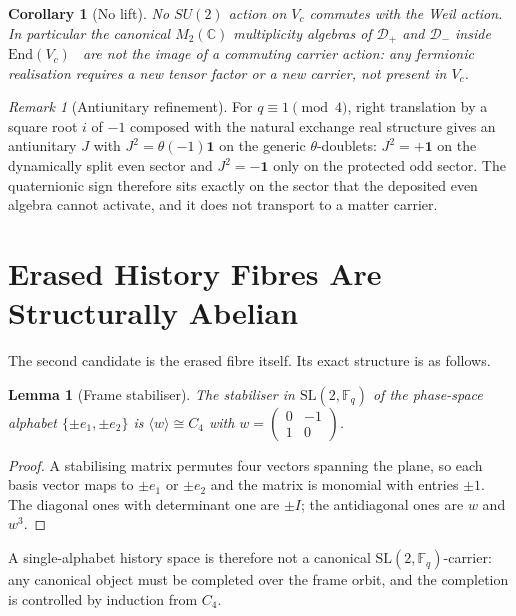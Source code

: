 \documentclass[11pt,a4paper]{article}
\newtheorem{lemma}[theorem]{Lemma}
\newtheorem{corollary}[theorem]{Corollary}
\theoremstyle{definition}
\theoremstyle{remark}
\newtheorem{remark}[theorem]{Remark}
\newcommand{\C}{\mathbb{C}}
\newcommand{\Fq}{\mathbb{F}_q}
\newcommand{\G}{\mathrm{SL}(2,\Fq)}
\newcommand{\End}{\mathrm{End}}
\newcommand{\Id}{\mathbf{1}}
\newcommand{\Dplus}{\mathcal{D}_{+}}
\newcommand{\Dminus}{\mathcal{D}_{-}}
\newcommand{\Vc}{V_{c}}
\begin{document}
\begin{corollary}[No lift]
  \label{cor:no-lift}
  No $SU(2)$ action on $\Vc$ commutes with the Weil action.
  In particular the canonical $M_2(\C)$ multiplicity algebras of $\Dplus$ and
  $\Dminus$ inside $\End(\Vc)$~\cite{Beau2026a37} are not the image of a commuting
  carrier action: any fermionic realisation requires a new tensor factor or a new
  carrier, not present in $\Vc$.
\end{corollary}

\begin{remark}[Antiunitary refinement]
  \label{rem:antiunitary}
  For $q\equiv1\pmod4$, right translation by a square root $i$ of $-1$ composed with the
  natural exchange real structure gives an antiunitary $J$ with $J^2=\theta(-1)\Id$ on
  the generic $\theta$-doublets: $J^2=+\Id$ on the dynamically split even sector and
  $J^2=-\Id$ only on the protected odd sector.
  The quaternionic sign therefore sits exactly on the sector that the deposited even
  algebra cannot activate, and it does not transport to a matter carrier.
\end{remark}

\section{Erased History Fibres Are Structurally Abelian}
\label{sec:fibres}

The second candidate is the erased fibre itself.
Its exact structure is as follows.

\begin{lemma}[Frame stabiliser]
  \label{lem:frame-stabiliser}
  The stabiliser in $\G$ of the phase-space alphabet $\{\pm e_1,\pm e_2\}$ is
  $\langle w\rangle\cong C_4$ with $w=\begin{pmatrix}0&-1\\1&0\end{pmatrix}$.
\end{lemma}

\begin{proof}
  A stabilising matrix permutes four vectors spanning the plane, so each basis vector
  maps to $\pm e_1$ or $\pm e_2$ and the matrix is monomial with entries $\pm1$.
  The diagonal ones with determinant one are $\pm I$; the antidiagonal ones are $w$ and
  $w^3$.
\end{proof}

A single-alphabet history space is therefore not a canonical $\G$-carrier: any canonical
object must be completed over the frame orbit, and the completion is controlled by
induction from $C_4$.
\end{document}
